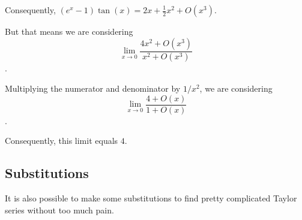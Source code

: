 \documentclass{ximera}
\begin{document}
\begin{question}
\begin{solution}
\begin{hint}
                  Consequently, \({\left(e^{x} - 1\right)} \tan\left(x\right) = 2x + \displaystyle\frac{1}{2}x^{2} + O(x^{3})\).
                \end{hint}
                \begin{hint}
                  But that means we are considering \[\lim_{x \to 0} \displaystyle\frac{4x^{2} + O(x^{3})}{x^{2} + O(x^{3})}\].
                \end{hint}
                \begin{hint}
                  Multiplying the numerator and denominator by \(1/x^2\), we are considering \[\lim_{x \to 0} \displaystyle\frac{4 + O(x)}{1 + O(x)}\].
                \end{hint}
                \begin{hint}
                  Consequently, this limit equals \(4\).

                \end{hint}


              \begin{multiple-choice}

              \end{multiple-choice}

              \end{solution}
            \end{question}
            
\subsection{Substitutions}

It is also possible to make some substitutions to find pretty complicated Taylor series without too much pain.
\end{document}
